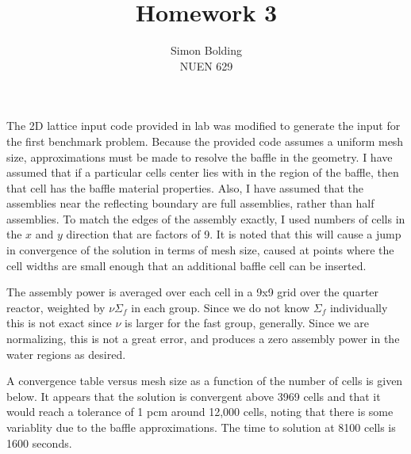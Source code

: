 \documentclass[12pt]{article}
\newenvironment{solnum}[2][Solution]{\begin{trivlist}
\item[\hskip \labelsep {\bfseries #1}\hskip \labelsep {\bfseries #2:}]\hspace{0.3in}\newline\newline}{\end{trivlist}}
\begin{document}
 
 
\title{Homework 3}%
\author{Simon Bolding\\ %
NUEN 629} %
 
\maketitle

\clearpage



\begin{solnum}{1-1}
    
The 2D lattice input code provided in lab was modified to generate the input for the
first
benchmark problem.  Because the
provided code assumes a uniform mesh size, approximations must be made to resolve the
baffle in the geometry.  I have assumed that if a particular cells center lies with
in the region of the baffle, then that cell has the baffle material properties.  Also, I have assumed that the assemblies near the reflecting
boundary are full assemblies, rather than half assemblies. To match the edges of the
assembly exactly, I used numbers of cells in the $x$ and $y$ direction that are
factors of 9.  It is noted that this will cause a jump in convergence of the solution
in terms of mesh size, caused at points where the cell widths are small enough that
an additional baffle  cell can be inserted.  

The assembly power is averaged over each
cell in a 9x9 grid over the quarter reactor, weighted by $\nu \Sigma_f$ in each
group.  Since we do not know $\Sigma_f$ individually this is not exact since $\nu$ is
larger for the fast group, generally.  Since we are normalizing, this is not a great
error, and produces a zero assembly power in the water regions as desired.

A convergence table versus mesh size as a function of the number of cells is given
below.  It appears that the solution is convergent above 3969 cells and that it
would reach a tolerance of 1 pcm around 12,000 cells, noting that there is some
variablity due to the baffle approximations.  The time to solution at 8100
cells is 1600 seconds. 


\end{solnum}
\end{document}
